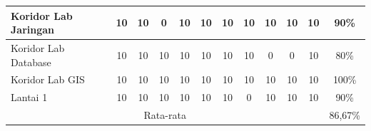 \begin{enumerate}
\begin{table}[H]
\begin{tabular}{|lccccccccccc|}
			      \multicolumn{1}{|l|}{Koridor Lab Jaringan}                            & \multicolumn{1}{c|}{10}                                 & \multicolumn{1}{c|}{10} & \multicolumn{1}{c|}{0}  & \multicolumn{1}{c|}{10} & \multicolumn{1}{c|}{10} & \multicolumn{1}{c|}{10} & \multicolumn{1}{c|}{10} & \multicolumn{1}{c|}{10} & \multicolumn{1}{c|}{10} & \multicolumn{1}{c|}{10} & 90\%  \\ \hline
			      \multicolumn{1}{|l|}{Koridor Lab Database}                            & \multicolumn{1}{c|}{10}                                 & \multicolumn{1}{c|}{10} & \multicolumn{1}{c|}{10} & \multicolumn{1}{c|}{10} & \multicolumn{1}{c|}{10} & \multicolumn{1}{c|}{10} & \multicolumn{1}{c|}{10} & \multicolumn{1}{c|}{0}  & \multicolumn{1}{c|}{0}  & \multicolumn{1}{c|}{10} & 80\%  \\ \hline
			      \multicolumn{1}{|l|}{Koridor Lab GIS}                                 & \multicolumn{1}{c|}{10}                                 & \multicolumn{1}{c|}{10} & \multicolumn{1}{c|}{10} & \multicolumn{1}{c|}{10} & \multicolumn{1}{c|}{10} & \multicolumn{1}{c|}{10} & \multicolumn{1}{c|}{10} & \multicolumn{1}{c|}{10} & \multicolumn{1}{c|}{10} & \multicolumn{1}{c|}{10} & 100\% \\ \hline
			      \multicolumn{1}{|l|}{Lantai 1}                                        & \multicolumn{1}{c|}{10}                                 & \multicolumn{1}{c|}{10} & \multicolumn{1}{c|}{10} & \multicolumn{1}{c|}{10} & \multicolumn{1}{c|}{10} & \multicolumn{1}{c|}{10} & \multicolumn{1}{c|}{0}  & \multicolumn{1}{c|}{10} & \multicolumn{1}{c|}{10} & \multicolumn{1}{c|}{10} & 90\%  \\ \hline
			      \multicolumn{11}{|c|}{Rata-rata}                                      & 86,67\%                                                                                                                                                                                                                                                                                                   \\ \hline
		      \end{tabular}
	      \end{table}

\end{enumerate}

